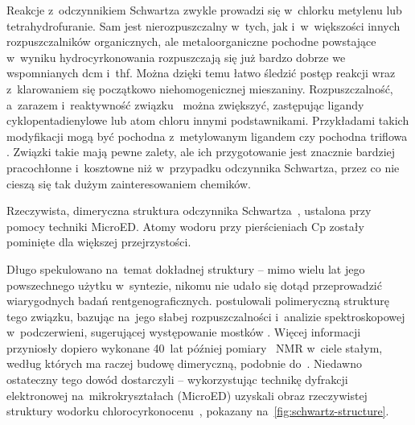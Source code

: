 Reakcje z~odczynnikiem Schwartza zwykle prowadzi się w~chlorku metylenu lub tetrahydrofuranie.
Sam \schwartz{} jest nierozpuszczalny w~tych, jak i~w~większości innych rozpuszczalników
  organicznych, ale metaloorganiczne pochodne powstające w~wyniku hydrocyrkonowania
  rozpuszczają się już bardzo dobrze we wspomnianych \acrshort{dcm} i~\acrshort{thf}.
Można dzięki temu łatwo śledzić postęp reakcji wraz z~klarowaniem się początkowo
  niehomogenicznej mieszaniny.
Rozpuszczalność, a~zarazem i~reaktywność związku~ można zwiększyć,
  zastępując ligandy cyklopentadienylowe lub atom chloru innymi podstawnikami.
Przykładami takich modyfikacji mogą być pochodna z~metylowanym ligandem
  \ch{[(MeCp)2Zr(H)Cl]} czy pochodna triflowa
  \ch{[Cp2Zr(H)OTf]}.
Związki takie mają pewne zalety, ale ich przygotowanie jest znacznie bardziej
  pracochłonne i~kosztowne niż w~przypadku odczynnika Schwartza,
  przez co nie cieszą się tak dużym zainteresowaniem chemików.

\begin{marginfigure}
  
  \caption{
    Rzeczywista, dimeryczna struktura odczynnika Schwartza~,
    ustalona przy pomocy techniki MicroED.
    Atomy wodoru przy pierścieniach Cp zostały pominięte dla większej przejrzystości.
  }
  \label{fig:schwartz-structure}
\end{marginfigure}
  Długo spekulowano na~temat dokładnej struktury \schwartz{} \---
  mimo wielu lat jego powszechnego użytku w~syntezie, nikomu nie udało się dotąd
  przeprowadzić wiarygodnych badań rentgenograficznych.
\citeauthor{wailes70} postulowali polimeryczną strukturę tego związku,
  bazując na~jego słabej rozpuszczalności i~analizie spektroskopowej w~podczerwieni,
  sugerującej występowanie mostków .
Więcej informacji przyniosły dopiero wykonane 40~lat później pomiary ~NMR
  w~ciele stałym, według których  ma raczej budowę dimeryczną,
  podobnie do~\ch{[Cp2Zr(H)Me]}.
Niedawno ostateczny tego dowód dostarczyli \citeauthor{jones19} \---
  wykorzystując technikę dyfrakcji elektronowej na~mikrokryształach (MicroED) uzyskali
  obraz rzeczywistej struktury wodorku chlorocyrkonocenu~,
  pokazany na~\cref{fig:schwartz-structure}.


